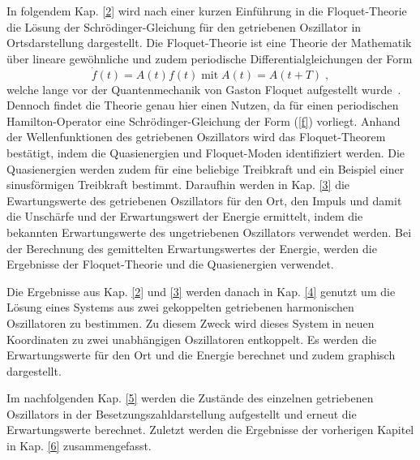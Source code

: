 In folgendem Kap. \ref{2} wird nach einer kurzen Einführung in die Floquet-Theorie die Lösung der Schrödinger-Gleichung für den getriebenen Oszillator in Ortsdarstellung dargestellt.
Die Floquet-Theorie ist eine Theorie der Mathematik über lineare gewöhnliche und zudem periodische Differentialgleichungen der Form
\begin{equation}
  \dot f(t)=A(t)f(t)\;\text{mit}\; A(t)=A(t+T) \; ,
  \label{f}
\end{equation}
welche lange vor der Quantenmechanik von Gaston Floquet aufgestellt wurde~\cite{haengi}.
Dennoch findet die Theorie genau hier einen Nutzen, da für einen periodischen Hamilton-Operator eine Schrödinger-Gleichung der Form (\ref{f}) vorliegt.
Anhand der Wellenfunktionen des getriebenen Oszillators wird das Floquet-Theorem bestätigt, indem die Quasienergien und Floquet-Moden identifiziert werden.
Die Quasienergien werden zudem für eine beliebige Treibkraft und ein Beispiel einer sinusförmigen Treibkraft bestimmt.
Daraufhin werden in Kap. \ref{3} die Ewartungswerte des getriebenen Oszillators für den Ort, den Impuls und damit die Unschärfe und der Erwartungswert der Energie ermittelt, indem die bekannten Erwartungswerte des ungetriebenen Oszillators verwendet werden.
Bei der Berechnung des gemittelten Erwartungswertes der Energie, werden die Ergebnisse der Floquet-Theorie und die Quasienergien verwendet.
\iffalse
Die Ergebnisse aus Kap. \ref{2} und \ref{3} werden danach in Kap. \ref{4} genutzt um die Lösung sowie die Erwartungswerte eines Systems aus zwei gekoppelten getriebenen harmonischen Oszillatoren zu bestimmen.
Die Erwartungswerte für den Ort und die Energie werden graphisch dargestellt und kommentiert.
Zu diesem Zweck wird dieses System in neuen Koordinaten zu zwei unabhängigen Oszillatoren entkoppelt.
\fi
Die Ergebnisse aus Kap. \ref{2} und \ref{3} werden danach in Kap. \ref{4} genutzt um die Lösung eines Systems aus zwei gekoppelten getriebenen harmonischen Oszillatoren zu bestimmen.
Zu diesem Zweck wird dieses System in neuen Koordinaten zu zwei unabhängigen Oszillatoren entkoppelt.
Es werden die Erwartungswerte für den Ort und die Energie berechnet und zudem graphisch dargestellt.

Im nachfolgenden Kap. \ref{5} werden die Zustände des einzelnen getriebenen Oszillators in der Besetzungszahldarstellung aufgestellt und erneut die Erwartungswerte berechnet.
Zuletzt werden die Ergebnisse der vorherigen Kapitel in Kap. \ref{6} zusammengefasst.
